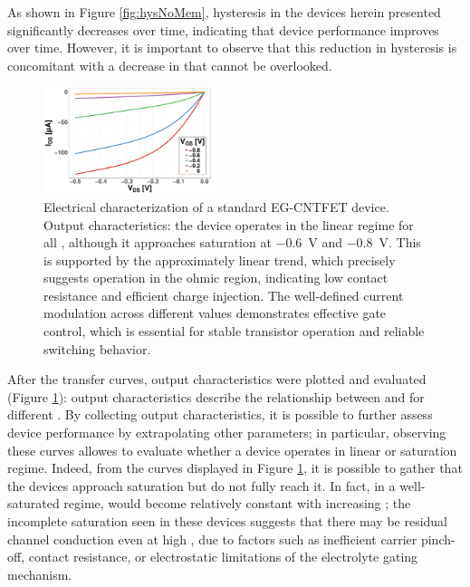 As shown in Figure \ref{fig:hysNoMem}, hysteresis in the devices herein presented significantly decreases over time, indicating that device performance improves over time. However, it is important to observe that this reduction in hysteresis is concomitant with a decrease in \ids{} that cannot be overlooked.

\begin{figure}[ht]
    \centering
    \includegraphics[width=0.45\textwidth]{figures/chapter3/EGFET/outputNoMem.pdf}
    \caption{Electrical characterization of a standard EG-CNTFET device. Output characteristics: the device operates in the linear regime for all \vds{}, although it approaches saturation at \SI{-0.6}{\V} and \SI{-0.8}{\V}. This is supported by the approximately linear trend, which precisely suggests operation in the ohmic region, indicating low contact resistance and efficient charge injection. The well-defined current modulation across different \vgs{} values demonstrates effective gate control, which is essential for stable transistor operation and reliable switching behavior.}
    \label{fig:outputNoMem}
\end{figure}

After the transfer curves, output characteristics were plotted and evaluated (Figure \ref{fig:outputNoMem}): output characteristics describe the relationship between \ids{} and \vds{} for different \vgs{}. By collecting output characteristics, it is possible to further assess device performance by extrapolating other parameters; in particular, observing these curves allowes to evaluate whether a device operates in linear or saturation regime. Indeed, from the curves displayed in Figure \ref{fig:outputNoMem}, it is possible to gather that the devices approach saturation but do not fully reach it. In fact, in a well-saturated regime, \ids{} would become relatively constant with increasing \vds{}; the incomplete saturation seen in these devices suggests that there may be residual channel conduction even at high \vds{}, due to factors such as inefficient carrier pinch-off, contact resistance, or electrostatic limitations of the electrolyte gating mechanism.

